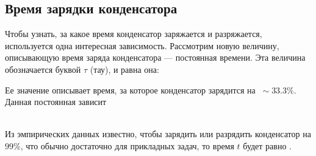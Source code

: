 \subsection{Время зарядки конденсатора}
Чтобы узнать, за какое время конденсатор заряжается и разряжается, используется одна интересная зависимость.
Рассмотрим новую величину, описывающую время заряда конденсатора --- постоянная времени. Эта величина обозначается буквой $\tau$ (тау), и равна она:


Ее значение описывает время, за которое конденсатор зарядится на $\ \sim \! 33.3\%$.
\\
Данная постоянная зависит \hrulefill

\hrulefill
\\
Из эмпирических данных известно, чтобы зарядить или разрядить конденсатор на $99\%$, что обычно достаточно для прикладных задач, то время $t$ будет равно \hrulefill.


